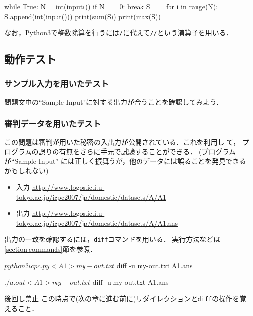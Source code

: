 \begin{pybox}
while True:
    N = int(input())
    if N == 0:
        break
    S = []
    for i in range(N):
        S.append(int(input()))
    print(sum(S))
    print(max(S))
\end{pybox}
なお，Python3で整数除算を行うには\texttt{/}に代えて\texttt{//}という演算子を用いる．


\subsection{動作テスト}

\subsubsection{サンプル入力を用いたテスト}

問題文中の``Sample Input''に対する出力が合うことを確認してみよう．

\subsubsection{審判データを用いたテスト}
この問題は審判が用いた秘密の入出力が公開されている．これを利用し
て， プログラムの誤りの有無をさらに手元で試験することができる．
(プログラムが``Sample Input'' には正しく振舞うが，他のデータには誤ることを発見できるかもしれない)
\begin{itemize}
\item 入力 \url{http://www.logos.ic.i.u-tokyo.ac.jp/icpc2007/jp/domestic/datasets/A/A1}
\item 出力 \url{http://www.logos.ic.i.u-tokyo.ac.jp/icpc2007/jp/domestic/datasets/A/A1.ans}
\end{itemize}

出力の一致を確認するには，\texttt{diff}コマンドを用いる．
実行方法などは\ref{section:commands}節を参照．

\begin{terminal}
$ python3 icpc.py < A1 > my-out.txt
$ diff -u my-out.txt A1.ans  
\end{terminal}

\begin{terminal}
$ ./a.out < A1 > my-out.txt
$ diff -u my-out.txt A1.ans  
\end{terminal}

\begin{warningbox}{後回し禁止}
  この時点で(次の章に進む前に)リダイレクションと\texttt{diff}の操作を覚えること．
\end{warningbox}


